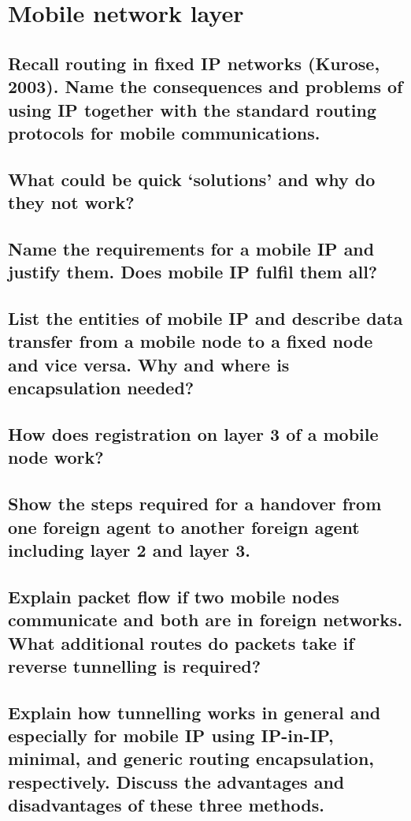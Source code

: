 \section{Mobile network layer}

\subsection{Recall routing in fixed IP networks (Kurose, 2003). Name the consequences and
problems of using IP together with the standard routing protocols for mobile
communications.}

\subsection{What could be quick ‘solutions’ and why do they not work?}

\subsection{Name the requirements for a mobile IP and justify them. Does mobile IP fulfil them
all?}

\subsection{List the entities of mobile IP and describe data transfer from a mobile node to a fixed
node and vice versa. Why and where is encapsulation needed?}

\subsection{How does registration on layer 3 of a mobile node work?}

\subsection{Show the steps required for a handover from one foreign agent to another foreign
agent including layer 2 and layer 3.}

\subsection{Explain packet flow if two mobile nodes communicate and both are in foreign
networks. What additional routes do packets take if reverse tunnelling is required?}

\subsection{Explain how tunnelling works in general and especially for mobile IP using IP-in-IP,
minimal, and generic routing encapsulation, respectively. Discuss the advantages
and disadvantages of these three methods.}

